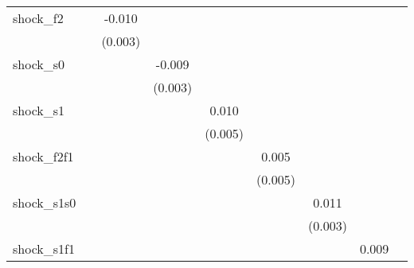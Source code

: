 {\begin{tabular}{l*{8}{c}}
\addlinespace
shock\_f2    &                     &      -0.010\sym{***}&                     &                     &                     &                     &                     &                     \\
            &                     &     (0.003)         &                     &                     &                     &                     &                     &                     \\
\addlinespace
shock\_s0    &                     &                     &      -0.009\sym{***}&                     &                     &                     &                     &                     \\
            &                     &                     &     (0.003)         &                     &                     &                     &                     &                     \\
\addlinespace
shock\_s1    &                     &                     &                     &       0.010\sym{*}  &                     &                     &                     &                     \\
            &                     &                     &                     &     (0.005)         &                     &                     &                     &                     \\
\addlinespace
shock\_f2f1  &                     &                     &                     &                     &       0.005         &                     &                     &                     \\
            &                     &                     &                     &                     &     (0.005)         &                     &                     &                     \\
\addlinespace
shock\_s1s0  &                     &                     &                     &                     &                     &       0.011\sym{***}&                     &                     \\
            &                     &                     &                     &                     &                     &     (0.003)         &                     &                     \\
\addlinespace
shock\_s1f1  &                     &                     &                     &                     &                     &                     &       0.009         &                     \\

\end{tabular}}
